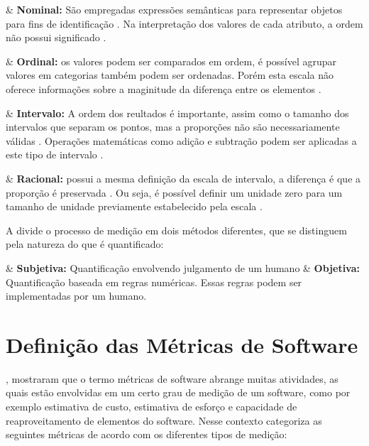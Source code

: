	\begin{easylist}[itemize]

& \textbf{Nominal:} São empregadas expressões semânticas para representar objetos para fins de identificação \cite{pandian_software_2004}. Na interpretação dos valores de cada atributo, a ordem não possui significado \cite{Meirelles2013}.

& \textbf{Ordinal:} os valores podem ser comparados em ordem, é possível agrupar valores em categorias também podem ser ordenadas. Porém esta escala não oferece informações sobre a maginitude da diferença entre os elementos \cite{metricsandmodels}.


& \textbf{Intervalo:} A ordem dos reultados é importante, assim como o tamanho dos intervalos que separam os pontos, mas a proporções não são necessariamente válidas \cite{Meirelles2013}. Operações matemáticas como adição e subtração podem ser aplicadas a este tipo de intervalo \cite{metricsandmodels}.

& \textbf{Racional:} possui a mesma definição da escala de intervalo, a diferença é que a proporção é preservada \cite{Meirelles2013}. Ou seja, é possível definir um unidade zero para um tamanho de unidade previamente estabelecido pela escala \cite{metricsandmodels}.


\end{easylist}
	
	A  divide o processo de medição em dois métodos diferentes, que se distinguem pela natureza do que é quantificado:
	
	\begin{easylist}[itemize]

	& \textbf{Subjetiva:} Quantificação envolvendo julgamento de um humano
	& \textbf{Objetiva:} Quantificação baseada em regras numéricas. Essas regras podem ser implementadas por um humano.

	\end{easylist}



\section{Definição das Métricas de Software}

, mostraram que o termo métricas de software abrange muitas atividades, as quais estão envolvidas em um certo grau de medição de um software, como por exemplo estimativa de custo, estimativa de esforço e capacidade de reaproveitamento de elementos do software. Nesse contexto  categoriza as seguintes métricas de acordo com os diferentes tipos de medição:

